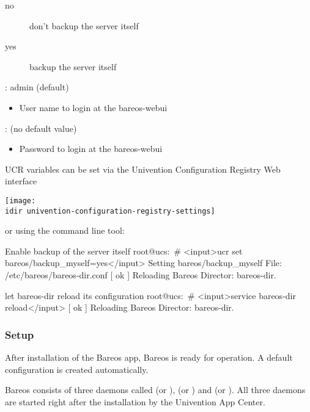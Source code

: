 \begin{description}
\begin{description}
	\item[no] don't backup the server itself
	\item[yes] backup the server itself
      \end{description}
        \item[\parameter{bareos/webui/console/user1/username}]: admin (default)
      \begin{itemize}
        \item User name to login at the bareos-webui
      \end{itemize}
        \item[\parameter{bareos/webui/console/user1/password}]: (no default value)
      \begin{itemize}
        \item Password to login at the bareos-webui
      \end{itemize}
    \end{description}

UCR variables can be set via the Univention Configuration Registry Web interface 

\begin{center}
  \texttt{[image: \\idir univention-configuration-registry-settings]}
\end{center}

or using the  command line tool:
\begin{commands}{Enable backup of the server itself}
root@ucs:~# <input>ucr set bareos/backup_myself=yes</input>
Setting bareos/backup_myself
File: /etc/bareos/bareos-dir.conf
[ ok ] Reloading Bareos Director: bareos-dir.
\end{commands}

\begin{commands}{let bareos-dir reload its configuration}
root@ucs:~# <input>service  bareos-dir reload</input>
[ ok ] Reloading Bareos Director: bareos-dir.
\end{commands}

\subsubsection{Setup}

After installation of the Bareos app, Bareos is ready for operation. A default configuration is created automatically.

Bareos consists of three daemons called  (or ),  (or ) and  (or ). All three daemons are started right after the installation by the Univention App Center.

